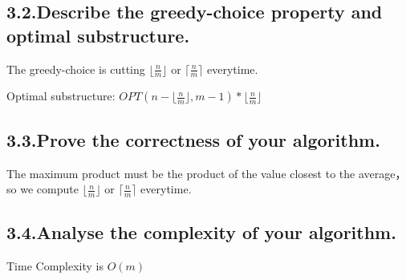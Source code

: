 \documentclass[10pt]{article}
\begin{document}
\subsection{3.2.\hspace*{0.5em}Describe the greedy-choice property and optimal substructure.}\label{sec-describe-the-greedy-choice-property-and-optimal-substructure}%

\noindent{}The greedy-choice is cutting $\lfloor \frac{n}{m} \rfloor$ or $\lceil \frac{n}{m} \rceil$ everytime.%

Optimal substructure: $OPT(n - \lfloor \frac{n}{m} \rfloor,m-1) * \lfloor \frac{n}{m} \rfloor$%

\subsection{3.3.\hspace*{0.5em}Prove the correctness of your algorithm.}\label{sec-prove-the-correctness-of-your-algorithm}%

\noindent{}The maximum product must be the product of the value closest to the average，so we compute\mdbr
{}$\lfloor \frac{n}{m} \rfloor$ or $\lceil \frac{n}{m} \rceil$ everytime.%

\subsection{3.4.\hspace*{0.5em}Analyse the complexity of your algorithm.}\label{sec-analyse-the-complexity-of-your-algorithm}%

\noindent{}Time Complexity is $O(m)$%
\end{document}
